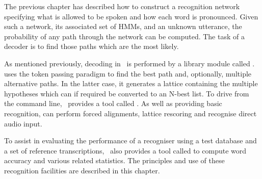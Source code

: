 %
%


The previous chapter has described how to construct a recognition
network specifying what is allowed to be spoken and how
each word is pronounced.  Given such a network, its associated
set of HMMs, and an unknown utterance,  the probability of
any path through the network can be computed.   The task of a 
decoder is to find those paths which are the most likely.

As mentioned previously, decoding in \HTK\ is performed by a library
module called .   uses the token passing
paradigm to find the best path and, optionally, multiple alternative
paths.  In the latter case, it generates a lattice containing the
multiple hypotheses which can if required be converted to an N-best
list.  To drive  from the command line, \HTK\ provides a
tool called .  As well as providing basic recognition,
 can perform forced alignments, lattice rescoring and
recognise direct audio input.  

To assist in evaluating the performance
of a recogniser using a test database and a set of reference transcriptions, 
\HTK\ also provides a tool called  to compute word 
accuracy and various related statistics.  
The principles and use of these recognition facilities are described
in this chapter.


